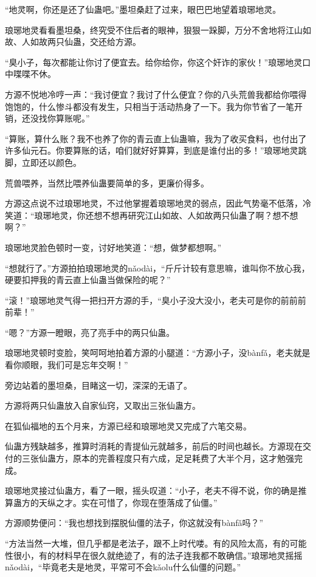 \begin{this_body}
“地灵啊，你还是还了仙蛊吧。”墨坦桑赶了过来，眼巴巴地望着琅琊地灵。

琅琊地灵看看墨坦桑，终究受不住后者的眼神，狠狠一跺脚，万分不舍地将江山如故、人如故两只仙蛊，交还给方源。

“臭小子，每次都能让你讨了便宜去。给你给你，你这个奸诈的家伙！”琅琊地灵口中喋喋不休。

方源不悦地冷哼一声：“我讨便宜？我讨了什么便宜？你的八头荒兽我都给你喂得饱饱的，什么惨斗都没有发生，只相当于活动热身了一下。我为你节省了一笔开销，还没找你算账呢。”

“算账，算什么账？我不也养了你的青云直上仙蛊嘛，我为了收买食料，也付出了许多仙元石。你要算账的话，咱们就好好算算，到底是谁付出的多！”琅琊地灵跳脚，立即还以颜色。

荒兽喂养，当然比喂养仙蛊要简单的多，更廉价得多。

方源这点说不过琅琊地灵，不过他掌握着琅琊地灵的弱点，因此气势毫不低落，冷笑道：“琅琊地灵，你还想不想再研究江山如故、人如故两只仙蛊了啊？想不想啊？”

琅琊地灵脸色顿时一变，讨好地笑道：“想，做梦都想啊。”

“想就行了。”方源拍拍琅琊地灵的nǎodài，“斤斤计较有意思嘛，谁叫你不放心我，硬要扣押我的青云直上仙蛊当做保险的呢？”

“滚！”琅琊地灵气得一把扫开方源的手，“臭小子没大没小，老夫可是你的前前前前辈！”

“嗯？”方源一瞪眼，亮了亮手中的两只仙蛊。

琅琊地灵顿时变脸，笑呵呵地拍着方源的小腿道：“方源小子，没bànfǎ，老夫就是看你顺眼，我们可是忘年交啊！”

旁边站着的墨坦桑，目睹这一切，深深的无语了。

方源将两只仙蛊放入自家仙窍，又取出三张仙蛊方。

在狐仙福地的五个月来，方源已经和琅琊地灵又完成了六笔交易。

仙蛊方残缺越多，推算时消耗的青提仙元就越多，前后的时间也越长。方源现在交付的三张仙蛊方，原本的完善程度只有六成，足足耗费了大半个月，这才勉强完成。

琅琊地灵接过仙蛊方，看了一眼，摇头叹道：“小子，老夫不得不说，你的确是推算蛊方的天纵之才。实在可惜了，你现在堕落成了仙僵。”

方源顺势便问：“我也想找到摆脱仙僵的法子，你这就没有bànfǎ吗？”

“方法当然一大堆，但几乎都是老法子，跟不上时代喽。有的风险太高，有的可能性很小，有的材料早在很久就绝迹了，有的法子连我都不敢确信。”琅琊地灵摇摇nǎodài，“毕竟老夫是地灵，平常可不会kǎolu什么仙僵的问题。”


\end{this_body}
